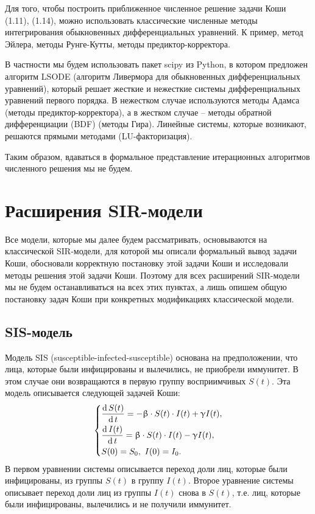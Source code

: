 \documentclass[a4paper, 14pt]{extreport}
\numberwithin{equation}{section}
\renewcommand{\beta}{\upbeta}
\renewcommand{\gamma}{\upgamma}
\renewcommand{\d}{\operatorname{d}}
\begin{document}
	Для того, чтобы построить приближенное численное решение задачи Коши 
	(1.11), (1.14), можно использовать классические численные методы интегрирования обыкновенных дифференциальных уравнений. К пример, метод Эйлера, методы Рунге-Кутты, методы предиктор-корректора.
	
	В частности мы будем использовать пакет scipy из Python, в котором предложен алгоритм LSODE (алгоритм Ливермора для обыкновенных дифференциальных уравнений), который решает жесткие и нежесткие системы дифференциальных уравнений первого порядка. В нежестком случае используются методы Адамса (методы предиктор-корректора), а в жестком случае -- методы обратной дифференциации (BDF) (методы Гира). Линейные системы, которые возникают, решаются прямыми методами (LU-факторизация).
	
	Таким образом, вдаваться в формальное представление итерационных алгоритмов численного решения мы не будем. 
	\section{Расширения SIR-модели}
	Все модели, которые мы далее будем рассматривать, основываются на классической SIR-модели, для которой мы описали формальный вывод задачи Коши, обосновали корректную постановку этой задачи Коши и исследовали методы решения этой задачи Коши. Поэтому для всех расширений SIR-модели мы не будем останавливаться на всех этих пунктах, а лишь опишем общую постановку задач Коши при конкретных модификациях классической модели. 
	\subsection{SIS-модель}
	Модель SIS (susceptible-infected-susceptible) основана на предположении, что лица, которые были инфицированы и вылечились, не приобрели
	иммунитет. В этом случае они возвращаются в первую группу восприимчивых $S(t)$. Эта модель описывается следующей задачей Коши:
	\begin{equation}
		\begin{dcases}
			\dfrac{\d S(t)}{\d t} = - \beta\cdot  S(t)\cdot I(t) + \gamma I(t),\\
		\dfrac{\d I(t)}{\d t} = \beta\cdot S(t)\cdot I(t) - \gamma I(t),\\
		S(0) = S_0,\ I(0) = I_0.
		\end{dcases}
	\end{equation}
	В первом уравнении системы описывается переход доли лиц, которые были инфицированы, из группы $S(t)$ в группу $I(t)$. Второе уравнение системы описывает переход
	доли лиц из группы $I(t)$ снова в $S(t)$, т.е. лиц, которые были инфицированы, вылечились и не получили иммунитет. 
	
\end{document}
